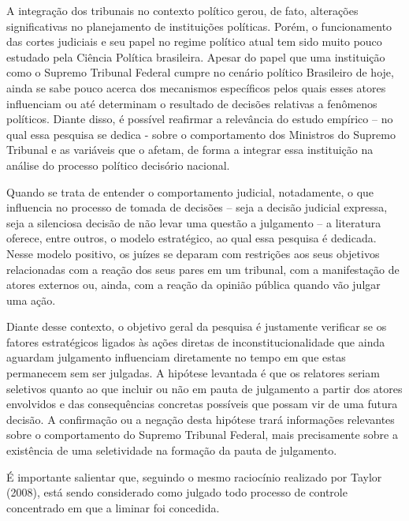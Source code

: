\documentclass[]{article}
\begin{document}
A integração dos tribunais no contexto político gerou, de fato,
alterações significativas no planejamento de instituições políticas.
Porém, o funcionamento das cortes judiciais e seu papel no regime
político atual tem sido muito pouco estudado pela Ciência Política
brasileira. Apesar do papel que uma instituição como o Supremo Tribunal
Federal cumpre no cenário político Brasileiro de hoje, ainda se sabe
pouco acerca dos mecanismos específicos pelos quais esses atores
influenciam ou até determinam o resultado de decisões relativas a
fenômenos políticos. Diante disso, é possível reafirmar a relevância do
estudo empírico -- no qual essa pesquisa se dedica - sobre o
comportamento dos Ministros do Supremo Tribunal e as variáveis que o
afetam, de forma a integrar essa instituição na análise do processo
político decisório nacional.

Quando se trata de entender o comportamento judicial, notadamente, o que
influencia no processo de tomada de decisões -- seja a decisão judicial
expressa, seja a silenciosa decisão de não levar uma questão a
julgamento -- a literatura oferece, entre outros, o modelo estratégico,
ao qual essa pesquisa é dedicada. Nesse modelo positivo, os juízes se
deparam com restrições aos seus objetivos relacionadas com a reação dos
seus pares em um tribunal, com a manifestação de atores externos ou,
ainda, com a reação da opinião pública quando vão julgar uma ação.

Diante desse contexto, o objetivo geral da pesquisa é justamente
verificar se os fatores estratégicos ligados às ações diretas de
inconstitucionalidade que ainda aguardam julgamento influenciam
diretamente no tempo em que estas permanecem sem ser julgadas. A
hipótese levantada é que os relatores seriam seletivos quanto ao que
incluir ou não em pauta de julgamento a partir dos atores envolvidos e
das consequências concretas possíveis que possam vir de uma futura
decisão. A confirmação ou a negação desta hipótese trará informações
relevantes sobre o comportamento do Supremo Tribunal Federal, mais
precisamente sobre a existência de uma seletividade na formação da pauta
de julgamento.

É importante salientar que, seguindo o mesmo raciocínio realizado por
Taylor (2008), está sendo considerado como julgado todo processo de
controle concentrado em que a liminar foi concedida.
\end{document}
